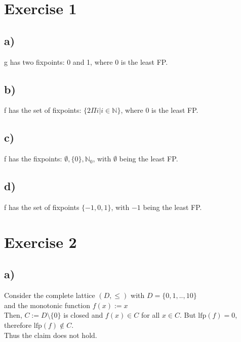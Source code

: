 \documentclass[fleqn,12pt]{article}
\begin{document}
\section*{Exercise 1}
\subsection*{a)}
g has two fixpoints: 0 and 1, where 0 is the least FP.
\subsection*{b)}
f has the set of fixpoints: $\{2\Pi i| i \in \mathbb{N}\}$, where 0 is the least FP.
\subsection*{c)}
f has the fixpoints: $\emptyset, \{0\}, \mathbb{N}_0$, with $\emptyset$ being the least FP.
\subsection*{d)}
f has the set of fixpoints $\{-1, 0, 1\}$, with $-1$ being the least FP. 

\newcommand\lfp{\text{lfp}}
\section*{Exercise 2}
\subsection*{a)}
Consider the complete lattice $(D,\leq)$ with $D = \{0,1,..,10\}$\\
and the monotonic function $f(x) := x$\\
Then, $C := D \setminus \{0\}$ is closed and $f(x) \in C$ for all $x \in C$.
But $\lfp(f) = 0$, therefore $\lfp(f) \not\in C$.\\
Thus the claim does not hold.
\end{document}
